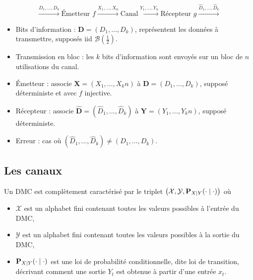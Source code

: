 \begin{defn}
	$$\overset{D_1,\ldots,D_k}{\longrightarrow}
		\text{Émetteur } f
	\overset{X_1,\ldots,X_n}{\longrightarrow}
		\text{Canal}
	\overset{Y_1,\ldots,Y_n}{\longrightarrow}
		\text{Récepteur } g
	\overset{\hat{D}_1,\ldots,\hat{D}_k}{\longrightarrow}$$
\end{defn}

\begin{voc}
	\begin{itemize}
		\item[\textbullet] Bits d'information : $\mathbf{D} = (D_1,\ldots,D_k)$, représentent les données à transmettre, supposés iid $\mathcal{B} \left( \frac{1}{2} \right) $.
		\item[\textbullet] Transmission en bloc : les $k$ bits d'information sont envoyés sur un bloc de $n$ utilisations du canal.
		\item[\textbullet] Émetteur : associe $\mathbf{X} = (X_1,\ldots,X_kn)$ à $\mathbf{D} = (D_1,\ldots,D_k)$, supposé déterministe et avec $f$ injective.
		\item[\textbullet] Récepteur : associe $\mathbf{\hat{D}} = \left( \hat{D}_1,\ldots,\hat{D}_k \right)$ à $\mathbf{Y} = (Y_1,\ldots,Y_kn)$, supposé déterministe.
		\item[\textbullet] Erreur : cas où $\left( \hat{D}_1,\ldots,\hat{D}_k \right) \neq (D_1,\ldots,D_k)$.
	\end{itemize}
\end{voc}


\subsection{Les canaux}

	\begin{defn}
		Un DMC est complètement caractérisé par le triplet $\left( \mathcal{X}, \mathcal{Y}, \mathbf{P}_{X \mid Y}(\cdot \mid \cdot) \right)$ où
		\begin{itemize}
			\item $\mathcal{X}$ est un alphabet fini contenant toutes les valeurs possibles à l'entrée du DMC,
			\item $\mathcal{Y}$ est un alphabet fini contenant toutes les valeurs possibles à la sortie du DMC,
			\item $\mathbf{P}_{X \mid Y}(\cdot \mid \cdot)$ est une loi de probabilité conditionnelle, dite loi de transition, décrivant comment une sortie $Y_t$ est obtenue à partir d'une entrée $x_t$.
		\end{itemize}
	\end{defn}

